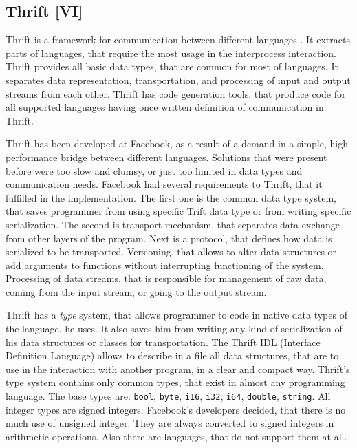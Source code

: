 \subsection{Thrift [VI]}
\label{subs:thrift}

Thrift is a framework for communication between different languages \cite{Slee2007, Thrift}.
It extracts parts of languages, that require the most usage in the interprocess interaction.
Thrift provides all basic data types, that are common for most of languages.
It separates data representation, transportation, and processing of input and output streams from each other.
Thrift has code generation tools, that produce code for all supported languages having once written definition of communication in Thrift.

Thrift has been developed at Facebook, as a result of a demand in a simple, high-performance bridge between different languages.
Solutions that were present before were too slow and clumsy, or just too limited in data types and communication needs.
Facebook had several requirements to Thrift, that it fulfilled in the implementation.
The first one is the common data type system, that saves programmer from using specific Trift data type or from writing specific serialization.
The second is transport mechanism, that separates data exchange from other layers of the program.
Next is a protocol, that defines how data is serialized to be transported.
Versioning, that allows to alter data structures or add arguments to functions without interrupting functioning of the system.
Processing of data streams, that is responsible for management of raw data, coming from the input stream, or going to the output stream. 

Thrift has a \textit{type}  system, that allows programmer to code in native data types of the language, he uses.
It also saves him from writing any kind of serialization of his data structures or classes for transportation.
The Thrift IDL (Interface Definition Language) allows to describe in a file all data structures, that are to use in the interaction with another program, in a clear and compact way.
Thrift's type system contains only common types, that exist in almost any programming language.
The base types are: \lstinline{bool}, \lstinline{byte}, \lstinline{i16}, \lstinline{i32}, \lstinline{i64}, \lstinline{double}, \lstinline{string}.
All integer types are signed integers.
Facebook's developers decided, that there is no much use of unsigned integer.
They are always converted to signed integers in arithmetic operations.
Also there are languages, that do not support them at all.

